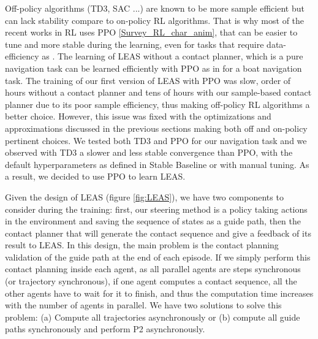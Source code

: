 Off-policy algorithms (TD3, SAC \cite{SAC} ...) are known to be more sample efficient but can lack stability compare to on-policy RL algorithms.
That is why most of the recent works in RL uses PPO \ref{Survey_RL_char_anim}, that can be easier to tune and more stable during the learning, even for tasks that require data-efficiency as \cite{openai2019dota}.
The learning of LEAS without a contact planner, which is a pure navigation task can be learned efficiently with PPO as in \cite{compare_PPO_TD3_SAC_DDPG} for a boat navigation task.
The training of our first version of LEAS \cite{LEAS} with PPO was slow, order of hours without a contact planner and tens of hours with our sample-based contact planner due to its poor sample efficiency, thus making off-policy RL algorithms a better choice.
However, this issue was fixed with the optimizations and approximations discussed in the previous sections making both off and on-policy pertinent choices.
We tested both TD3 and PPO for our navigation task and we observed with TD3 a slower and less stable convergence than PPO, with the default hyperparameters as defined in Stable Baseline or with manual tuning.
As a result, we decided to use PPO to learn LEAS.

Given the design of LEAS (figure \ref{fig:LEAS}), we have two components to consider during the training: first, our steering method is a policy taking actions in the environment and saving the sequence of states as a guide path, then the contact planner that will generate the contact sequence and give a feedback of its result to LEAS. 
In this design, the main problem is the contact planning validation of the guide path at the end of each episode. 
If we simply perform this contact planning inside each agent, as all parallel agents are steps synchronous (or trajectory synchronous), if one agent computes a contact sequence, all the other agents have to wait for it to finish, and thus the computation time increases with the number of agents in parallel.
We have two solutions to solve this problem: (a) Compute all trajectories asynchronously or (b) compute all guide paths synchronously and perform P2 asynchronously.

